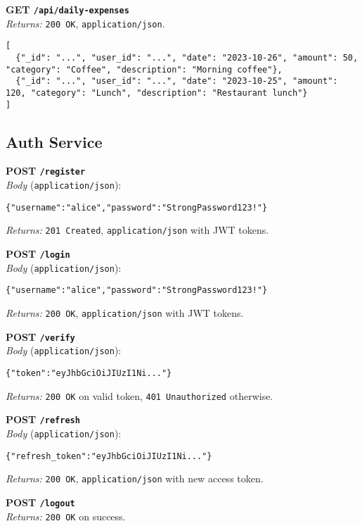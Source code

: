 \documentclass[conference]{IEEEtran}
\begin{document}
\noindent\textbf{GET \texttt{/api/daily-expenses}} \\
\emph{Returns:} \texttt{200 OK}, \texttt{application/json}.
\begin{lstlisting}[style=json]
[
  {"_id": "...", "user_id": "...", "date": "2023-10-26", "amount": 50, "category": "Coffee", "description": "Morning coffee"},
  {"_id": "...", "user_id": "...", "date": "2023-10-25", "amount": 120, "category": "Lunch", "description": "Restaurant lunch"}
]
\end{lstlisting}

\subsection{Auth Service}
\noindent\textbf{POST \texttt{/register}} \\
\emph{Body} (\texttt{application/json}):
\begin{lstlisting}[style=json]
{"username":"alice","password":"StrongPassword123!"}
\end{lstlisting}
\emph{Returns:} \texttt{201 Created}, \texttt{application/json} with JWT tokens.

\noindent\textbf{POST \texttt{/login}} \\
\emph{Body} (\texttt{application/json}):
\begin{lstlisting}[style=json]
{"username":"alice","password":"StrongPassword123!"}
\end{lstlisting}
\emph{Returns:} \texttt{200 OK}, \texttt{application/json} with JWT tokens.

\noindent\textbf{POST \texttt{/verify}} \\
\emph{Body} (\texttt{application/json}):
\begin{lstlisting}[style=json]
{"token":"eyJhbGciOiJIUzI1Ni..."}
\end{lstlisting}
\emph{Returns:} \texttt{200 OK} on valid token, \texttt{401 Unauthorized} otherwise.

\noindent\textbf{POST \texttt{/refresh}} \\
\emph{Body} (\texttt{application/json}):
\begin{lstlisting}[style=json]
{"refresh_token":"eyJhbGciOiJIUzI1Ni..."}
\end{lstlisting}
\emph{Returns:} \texttt{200 OK}, \texttt{application/json} with new access token.

\noindent\textbf{POST \texttt{/logout}} \\
\emph{Returns:} \texttt{200 OK} on success.
\end{document}
